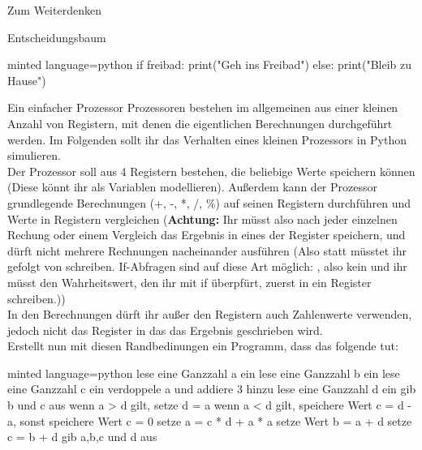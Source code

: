 \begin{task}[points=auto]{Zum Weiterdenken }
\begin{subtask*}[points=0]{Entscheidungsbaum}
\begin{solution}
\begin{codeBlock}[]{minted language=python}
                if freibad:
                    print("Geh ins Freibad")
                else:
                    print("Bleib zu Hause")
            \end{codeBlock}
        \end{solution}
    \end{subtask*}
    \begin{subtask*}[points=0]{Ein einfacher Prozessor}
        Prozessoren bestehen im allgemeinen aus einer kleinen Anzahl von Registern, mit denen die eigentlichen Berechnungen durchgeführt werden. Im Folgenden sollt ihr das Verhalten eines kleinen Prozessors in Python simulieren. \\
        Der Prozessor soll aus 4 Registern bestehen, die beliebige Werte speichern können (Diese könnt ihr als Variablen modellieren). Außerdem kann der Prozessor grundlegende Berechnungen (+, -, *, /, \%) auf seinen Registern durchführen und Werte in Registern vergleichen (\textbf{Achtung:} Ihr müsst also nach jeder einzelnen Rechung oder einem Vergleich das Ergebnis in eines der Register speichern, und dürft nicht mehrere Rechnungen nacheinander ausführen (Also statt  müsstet ihr  gefolgt von  schreiben. If-Abfragen sind auf diese Art möglich: , also kein  und ihr müsst den Wahrheitswert, den ihr mit if überpfürt, zuerst in ein Register schreiben.)) \\
        In den Berechnungen dürft ihr außer den Registern auch Zahlenwerte verwenden, jedoch nicht das Register in das das Ergebnis geschrieben wird.\\
        Erstellt nun mit diesen Randbedinungen ein Programm, dass das folgende tut: \\
        \begin{codeBlock}[]{minted language=python}
            lese eine Ganzzahl a ein
            lese eine Ganzzahl b ein
            lese eine Ganzzahl c ein
            verdoppele a und addiere 3 hinzu
            lese eine Ganzzahl d ein
            gib b und c aus
            wenn a > d gilt, setze d = a
            wenn a < d gilt, speichere Wert c = d - a, sonst speichere Wert c = 0
            setze a = c * d + a * a
            setze Wert b = a + d
            setze c = b + d
            gib a,b,c und d aus
        \end{codeBlock}


\end{subtask*}
\end{task}
